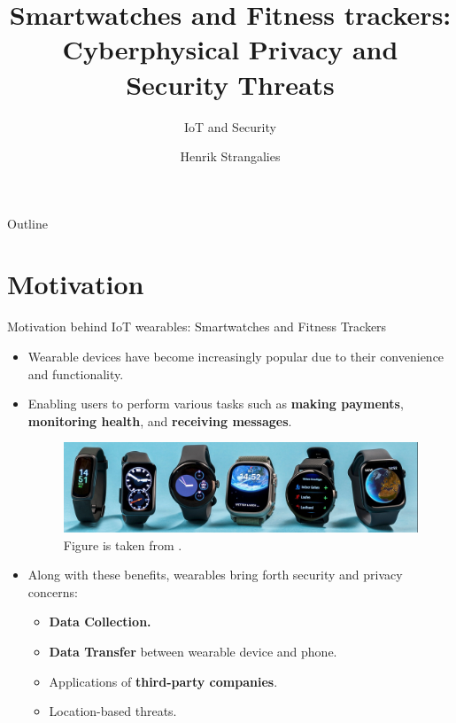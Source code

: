 \documentclass[ucs,9pt]{beamer}
\title[Privacy and Security Threats of IoT Wearables] %
{Smartwatches and Fitness trackers: Cyberphysical Privacy and Security Threats}
\subtitle
{IoT and Security}
\author[Author, Another] %
{Henrik Strangalies} %
\institute[Computer Science] %
{Freie Universität Berlin}
\begin{document}
\begin{frame}[plain]
  \titlepage
\end{frame}

\begin{frame}{Outline}
  \tableofcontents
\end{frame}

\section{Motivation}



\begin{frame}{Motivation behind IoT wearables: Smartwatches and Fitness Trackers}
  \begin{itemize}
  \item Wearable devices have become increasingly popular
   due to their convenience and functionality.
  \item Enabling users to perform various tasks such as \textbf{making payments}, \textbf{monitoring health}, and \textbf{receiving messages}.
  
  \begin{figure}
  	\includegraphics[width=\linewidth]{imgs/smartwatches}
  	\caption{Figure is taken from \cite{smartwatches}.}
  \end{figure}
  
  \pause 
  
  \item  Along with these benefits, wearables bring forth security and privacy concerns:
  \begin{itemize}
	\item \textbf{Data Collection.}
	\item \textbf{Data Transfer} between wearable device and phone.
	\item Applications of \textbf{third-party companies}.
	\item Location-based threats.
  \end{itemize}
  \end{itemize}
\end{frame}
\end{document}
